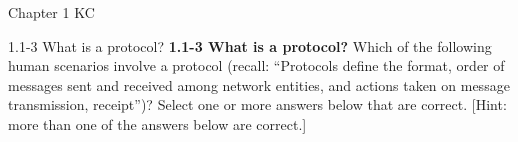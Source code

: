 \documentclass[a4paper]{article}
\begin{document}
\begin{quiz}{Chapter 1 KC}




\begin{multi}[points=1,multiple]{1.1-3 What is a protocol?}
\textbf{1.1-3 What is a protocol?} 
Which of the following human scenarios involve a protocol 
(recall: ``Protocols define the format, order of messages sent and received among network entities, and actions taken on message transmission, receipt'')? 
Select one or more answers below that are correct. [Hint: more than one of the answers below are correct.]


\end{multi}
\end{quiz}
\end{document}
